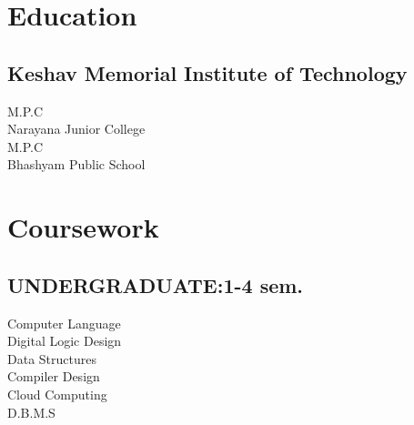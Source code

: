 \documentclass[]{deedy-resume-openfont}
\begin{document}
%
%
\lastupdated

%
%



%
%

\begin{minipage}[t]{0.33\textwidth} 


\section{Education} 

\subsection{Keshav Memorial Institute of Technology}
\sectionsep


M.P.C \\
Narayana Junior College \\

\sectionsep
{}
M.P.C \\
Bhashyam Public School \\

\sectionsep





\section{Coursework}
\subsection{UNDERGRADUATE:1-4 sem.}
Computer Language \\
Digital Logic Design \\
Data Structures \\
Compiler Design \\
Cloud Computing \\
D.B.M.S\\
\sectionsep


\end{minipage}
\end{document}
